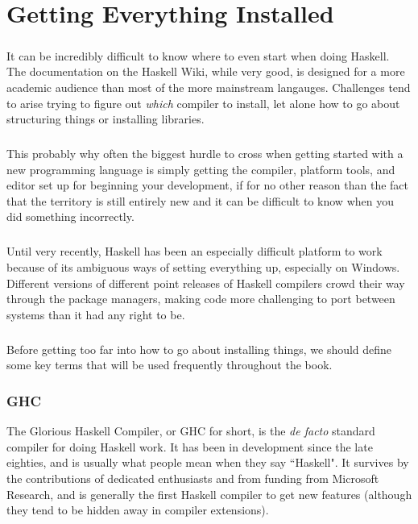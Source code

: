 \chapter{Getting Everything Installed}


\paragraph{}
It can be incredibly difficult to know where to even start when doing Haskell.  The documentation on the Haskell Wiki, while very good, is designed for a more academic audience than most of the more mainstream langauges. Challenges tend to arise trying to figure out \textit{which} compiler to install, let alone how to go about structuring things or installing libraries.  

\paragraph{}
This probably why often the biggest hurdle to cross when getting started with a new programming language is simply getting the compiler, platform tools, and editor set up for beginning your development, if for no other reason than the fact that the territory is still entirely new and it can be difficult to know when you did something incorrectly.  

\paragraph{}
Until very recently, Haskell has been an especially difficult platform to work because of its ambiguous ways of setting everything up, especially on Windows. Different versions of different point releases of Haskell compilers crowd their way through the package managers, making code more challenging to port between systems than it had any right to be. 

\paragraph{}
Before getting too far into how to go about installing things, we should define some key terms that will be used frequently throughout the book. 


\subsection{GHC}
The Glorious Haskell Compiler, or GHC for short, is the \textit{de facto} standard compiler for doing Haskell work.  It has been in development since the late eighties, and is usually what people mean when they say ``Haskell".  It survives by the contributions of dedicated enthusiasts and from funding from Microsoft Research, and is generally the first Haskell compiler to get new features (although they tend to be hidden away in compiler extensions). 

